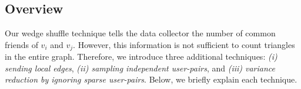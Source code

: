 \subsection{Overview}
\label{chap3-sub:triangle_overview}
Our wedge shuffle technique tells the data collector the number of common friends of $v_i$ and $v_j$. 
However, this information is not sufficient to count triangles in the entire graph. 
Therefore, we introduce 
three additional techniques: 
\textit{(i) sending local edges}, 
\textit{(ii) sampling independent user-pairs}, 
and 
\textit{(iii) variance reduction by ignoring sparse user-pairs}. 
Below, we briefly explain each technique. 

